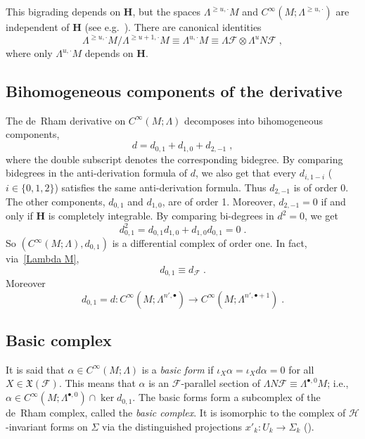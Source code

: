 \documentclass{memo-l}
\theoremstyle{plain}
\theoremstyle{definition}
\theoremstyle{remark}
\newcommand{\FF}{\mathcal{F}}
\newcommand{\HH}{\mathcal{H}}
\newcommand{\fX}{\mathfrak{X}}
\newcommand{\bfH}{\boldsymbol{H}}
\numberwithin{section}{chapter}
\numberwithin{equation}{section}%
\begin{document}
This bigrading depends on $\bfH$, but the spaces $\Lambda^{\ge u,\cdot}M$ and $C^\infty(M;\Lambda^{\ge u,\cdot})$ are independent of $\bfH$ (see e.g.\ \cite{Alv1989a}). There are canonical identities
\begin{equation}\label{bigwedge^ge u cdot T^*M / bigwedge^ge u+1 cdot T^*M}
\Lambda^{\ge u,\cdot}M/\Lambda^{\ge u+1,\cdot}M\equiv\Lambda^{u,\cdot}M\equiv\Lambda\FF\otimes\Lambda^uN\FF\;,
\end{equation}
where only $\Lambda^{u,\cdot}M$ depends on $\bfH$.

\subsection{Bihomogeneous components of the derivative}\label{ss: d_i j}

The de~Rham derivative on $C^\infty(M;\Lambda)$ decomposes into bihomogeneous components,
\begin{equation}\label{d = d_0 1 + d_1 0 + d_2 -1}
d=d_{0,1}+d_{1,0}+d_{2,-1}\;,
\end{equation}
where the double subscript denotes the corresponding bidegree. By comparing bidegrees in the anti-derivation formula of $d$, we also get that every $d_{i,1-i}$ ($i\in\{0,1,2\}$)  satisfies the same anti-derivation formula. Thus $d_{2,-1}$ is of order 0. The other components, $d_{0,1}$ and $d_{1,0}$, are of order 1. Moreover, $d_{2,-1}=0$ if and only if $\bfH$ is completely integrable. By comparing bi-degrees in $d^2=0$, we get \cite{Alv1989a}
\begin{equation}\label{d_0,1^2=...=0}
  d_{0,1}^2=d_{0,1}d_{1,0}+d_{1,0}d_{0,1}=0\;.
\end{equation}
So $(C^\infty(M;\Lambda),d_{0,1})$ is a differential complex of order one. In fact, via~\eqref{Lambda M},
\begin{equation}\label{d_0 1 equiv d_FF}
d_{0,1}\equiv d_\FF\;.
\end{equation}
Moreover
\begin{equation}\label{d_0 1 = d on C^infty(M Lambda^n' cdot)}
d_{0,1}=d:C^\infty(M;\Lambda^{n',\bullet})\to C^\infty(M;\Lambda^{n',\bullet+1})\;.
\end{equation}


\subsection{Basic complex}\label{ss: basic complex}

It is said that $\alpha\in C^\infty(M;\Lambda)$ is a \emph{basic form} if $\iota_X\alpha=\iota_Xd\alpha=0$ for all $X\in\fX(\FF)$. This means that $\alpha$ is an $\FF$-parallel section of $\Lambda N\FF\equiv\Lambda^{\bullet,0}M$; i.e., $\alpha\in C^\infty(M;\Lambda^{\bullet,0})\cap\ker d_{0,1}$. The basic forms form a subcomplex of the de~Rham complex, called the \emph{basic complex}.  It is isomorphic to the complex of $\HH$-invariant forms on $\Sigma$ via the distinguished projections $x'_k:U_k\to\Sigma_k$ ().
\end{document}
